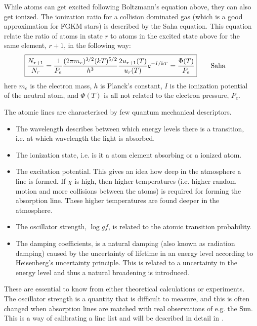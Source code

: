 While atoms can get excited following Boltzmann's equation above, they can also
get ionized. The ionization ratio for a collision dominated gas (which is a good
approximation for FGKM stars) is described by the Saha equation. This equation
relate the ratio of atoms in state $r$ to atoms in the excited state above for
the same element, $r+1$, in the following way:
\begin{align}
  \Aboxed{ \frac{N_{r+1}}{N_r} = \frac{1}{P_e} \frac{(2\pi m_e)^{3/2}(kT)^{5/2}}{h^3} \frac{2u_{r+1}(T)}{u_r(T)} e^{-I/kT} = \frac{\Phi(T)}{P_e}} \tag*{Saha}
\end{align}
here $m_e$ is the electron mass, $h$ is Planck's constant, $I$ is the ionization
potential of the neutral atom, and $\Phi(T)$ is all not related to the electron
pressure, $P_e$.

The atomic lines are characterised by few quantum mechanical descriptors.
\begin{itemize}
  \item The wavelength describes between which energy levels there is a
        transition, i.e. at which wavelength the light is absorbed.
  \item The ionization state, i.e. is it a atom element absorbing or a ionized
        atom.
  \item The excitation potential. This gives an idea how deep in the atmosphere
        a line is formed. If $\chi$ is high, then higher temperatures (i.e.
        higher random motion and more collisions between the atoms) is required
        for forming the absorption line. These higher temperatures are found
        deeper in the atmosphere.
  \item The oscillator strength, $\log \mathit{gf}$, is related to the atomic
        transition probability.
  \item The damping coefficients, is a natural damping (also known as radiation
        damping) caused by the uncertainty of lifetime in an energy level
        according to Heisenberg's uncertainty principle. This is related to a
        uncertainty in the energy level and thus a natural broadening is
        introduced.
\end{itemize}
These are essential to know from either theoretical calculations or experiments.
The oscillator strength is a quantity that is difficult to measure, and this
is often changed when absorption lines are matched with real observations of
e.g. the Sun. This is a way of calibrating a line list and will be described in
detail in .

